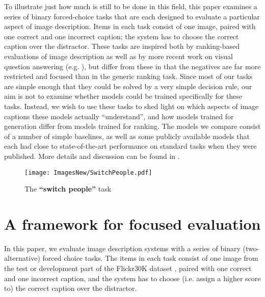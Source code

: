 \documentclass[11pt]{article}
\begin{document}
To illustrate just how much is still to be done in this field, this paper examines a series of binary forced-choice tasks that are each designed to evaluate a particular aspect of image description. Items in each task consist of one image, paired with one correct and one incorrect caption; the system has to choose the correct caption over the distractor. These tasks are inspired both by ranking-based evaluations of image description as well as by more recent work on visual question answering (e.g. ), but differ from these in that the negatives are far more restricted and focused than in the generic ranking task.
Since most of our tasks are simple enough that they could be solved by a very simple decision rule, our aim is not to examine whether models could be trained specifically for these tasks. Instead, we wish to use these tasks to shed light on which aspects of image captions these models actually ``understand'', and how models trained for generation differ from models trained for ranking. 
The models we compare consist of a number of simple baselines, as well as some publicly available models that each had close to state-of-the-art performance on standard tasks when they were published. More details and discussion can be found in .






\begin{figure}[tb] 
\centering \texttt{[image: ImagesNew/SwitchPeople.pdf]} \vspace{-.5in}
\caption{The \textbf{``switch people''} task}
\label{fig:SwitchPeople} 
\end{figure}





\section{A framework for focused evaluation}
In this paper, we evaluate image description systems with a series of binary (two-alternative) forced choice tasks. The items in each task consist of one image from the test or development part of the Flickr30K dataset \cite{young2014image}, paired with one correct and one incorrect caption, and the system has to choose (i.e. assign a higher score to) the correct caption over the distractor. 
\end{document}
